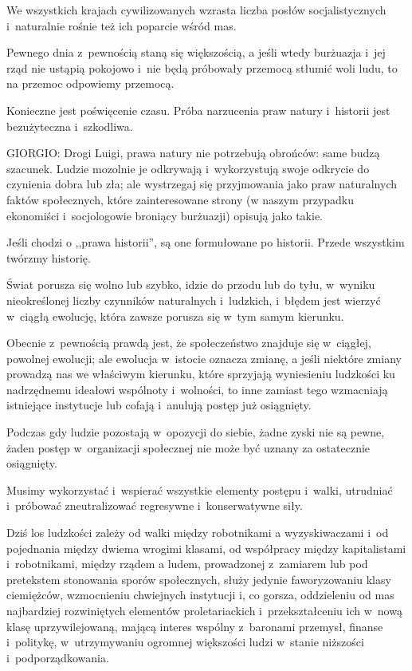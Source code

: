 \documentclass[oneside,polish,11pt,sfheadings]{mwbk}
\begin{document}
 
We wszystkich krajach cywilizowanych wzrasta liczba posłów socjalistycznych i~naturalnie rośnie też ich poparcie wśród
mas. 

 
Pewnego dnia z~pewnością staną się większością, a jeśli wtedy burżuazja i~jej rząd nie ustąpią pokojowo i~nie będą
próbowały przemocą stłumić woli ludu, to na przemoc odpowiemy przemocą. 

 
Konieczne jest poświęcenie czasu. Próba narzucenia praw natury i~historii jest bezużyteczna i~szkodliwa. 




 
\noindent GIORGIO: Drogi Luigi, prawa natury nie potrzebują obrońców: same budzą szacunek. Ludzie mozolnie je odkrywają i~wykorzystują swoje odkrycie do czynienia dobra lub zła; ale wystrzegaj się przyjmowania jako praw naturalnych faktów
społecznych, które zainteresowane strony (w naszym przypadku ekonomiści i~socjologowie broniący burżuazji) opisują jako
takie. 

 
Jeśli chodzi o ,,prawa historii'', są one formułowane po historii. Przede wszystkim twórzmy historię. 

 
Świat porusza się wolno lub szybko, idzie do przodu lub do tyłu, w~wyniku nieokreślonej liczby czynników naturalnych i~ludzkich, i~błędem jest wierzyć w~ciągłą ewolucję, która zawsze porusza się w~tym samym kierunku. 

 
Obecnie z~pewnością prawdą jest, że społeczeństwo znajduje się w~ciągłej, powolnej ewolucji; ale ewolucja w~istocie
oznacza zmianę, a jeśli niektóre zmiany prowadzą nas we właściwym kierunku, które sprzyjają wyniesieniu ludzkości ku
nadrzędnemu ideałowi wspólnoty i~wolności, to inne zamiast tego wzmacniają istniejące instytucje lub cofają i~anulują
postęp już osiągnięty. 

 
Podczas gdy ludzie pozostają w~opozycji do siebie, żadne zyski nie są pewne, żaden postęp w~organizacji społecznej nie
może być uznany za ostatecznie osiągnięty. 

 
Musimy wykorzystać i~wspierać wszystkie elementy postępu i~walki, utrudniać i~próbować zneutralizować regresywne i~konserwatywne siły. 

 
Dziś los ludzkości zależy od walki między robotnikami a wyzyskiwaczami i~od pojednania między dwiema wrogimi klasami, od
współpracy między kapitalistami i~robotnikami, między rządem a ludem, prowadzonej z~zamiarem lub pod pretekstem
stonowania sporów społecznych, służy jedynie faworyzowaniu klasy ciemiężców, wzmocnieniu chwiejnych instytucji i, co
gorsza, oddzieleniu od mas najbardziej rozwiniętych elementów proletariackich i~przekształceniu ich w~nową klasę
uprzywilejowaną, mającą interes wspólny z~baronami przemysł, finanse i~politykę, w~utrzymywaniu ogromnej większości
ludzi w~stanie niższości i~podporządkowania. 
\end{document}
